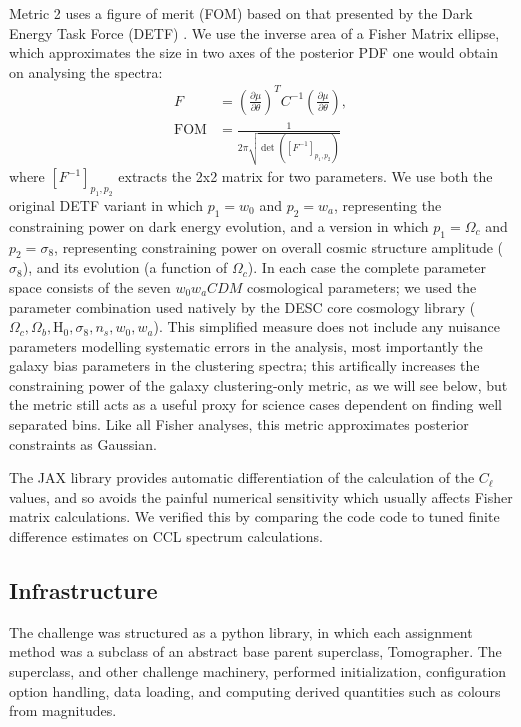 \documentclass[twocolumn,twocolappendix]{aastex63}
\begin{document}
Metric 2 uses a figure of merit (FOM) based on that presented by the Dark Energy Task Force (DETF) \citep{detf}.  We 
use the inverse area of a Fisher Matrix ellipse, which approximates the size in two axes 
of the posterior PDF one would obtain on analysing the spectra:
\begin{align}
    F &= \left( \frac{\partial \mu}{\partial \theta} \right)^T C^{-1} \left( \frac{\partial \mu}{\partial \theta} \right), \\
    \mathrm{FOM} &= \frac{1}{2 \pi \sqrt{\det{([F^{-1}]_{p_1, p_2})}}}
\label{eq:fom}
\end{align}
where $[F^{-1}]_{p_1, p_2}$ extracts the 2x2 matrix for two parameters.  We use both the original
DETF variant in which $p_1 = w_0$ and $p_2 = w_a$, representing the constraining power on dark energy 
evolution, and a version in which $p_1 = \Omega_c$ and $p_2 = \sigma_8$, representing constraining
power on overall cosmic structure amplitude ($\sigma_8$), and its evolution (a function of $\Omega_c$). In each case the complete parameter space consists
of the seven $w_0w_aCDM$ cosmological parameters; we used the parameter combination used natively by the DESC core cosmology library \citep{ccl} ($\Omega_c, \Omega_b, \mathrm{H}_0, \sigma_8, n_s, w_0, w_a$). This simplified measure does not include any nuisance
parameters modelling systematic errors in the analysis, most importantly the galaxy bias parameters in the clustering 
spectra; this artifically increases the constraining power of the galaxy clustering-only metric, as we will see below, but the metric still acts as a useful proxy for science cases dependent on finding well separated bins.
Like all Fisher analyses, this metric approximates posterior constraints as Gaussian. 

The JAX library provides automatic differentiation of the calculation of the $C_\ell$ values, and so avoids the painful numerical sensitivity which usually affects Fisher matrix calculations. We verified this by comparing the code code to tuned finite difference estimates on CCL spectrum calculations.

\subsection{Infrastructure}

The challenge was structured as a python library, in which each assignment
method was a subclass of an abstract base parent superclass, {\sc Tomographer}.
The superclass, and other challenge machinery, performed initialization,
configuration option handling, data loading, and computing derived quantities
such as colours from magnitudes.
\end{document}
